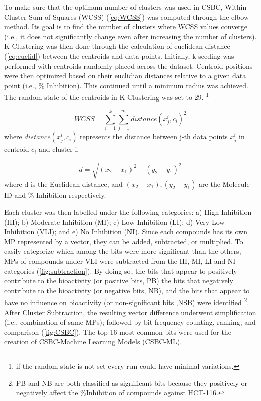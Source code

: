 To make sure that the optimum number of clusters was used in CSBC, Within-Cluster Sum of Squares (WCSS) (\autoref{eq:WCSS}) was computed through the elbow method. Its goal is to find the number of clusters where WCSS values converge (i.e., it does not significantly change even after increasing the number of clusters). K-Clustering was then done through the calculation of euclidean distance (\autoref{eq:euclid}) between the centroids and data points. Initially, k-seeding was performed with centroids randomly placed across the dataset. Centroid positions were then optimized based on their euclidian distances relative to a given data point (i.e., \% Inhibition). This continued until a minimum radius was achieved. The random state of the centroids in K-Clustering was set to 29. \footnote{if the random state is not set every run could have minimal variations.}


\begin{equation}
   WCSS =\sum_{i=1}^{k}\sum_{j=1}^{n_{i}}distance(x^{i}_{j},c_{i})^{2}
   \label{eq:WCSS}
\end{equation}    
where $distance(x^{i}_{j},c_{i})$ represents the distance between j-th data points $x^{i}_{j}$ in centroid $c_{i}$ and  cluster i. 

   
 \begin{equation}
    d =\sqrt{(x_{2}-x_{1})^2 +(y_{2}-y_{1})^2}
\label{eq:euclid}
\end{equation}
where d is the Euclidean distance, and $(x_{2}-x_{1}),(y_{2}-y_{1})$ are the Molecule ID and \% Inhibition respectively. 

Each cluster was then labelled under the following categories: a) High Inhibition (HI); b) Moderate Inhibition (MI); c) Low Inhibition (LI); d) Very Low Inhibition (VLI); and e) No Inhibition (NI). Since each compounds has its own MP represented by a vector, they can be added, subtracted, or multiplied. To easily categorize which among the bits were more significant than the others, MPs of compounds under VLI were subtracted from the HI, MI, LI and NI categories (\autoref{fig:subtraction}). By doing so, the bits that appear to positively contribute to the bioactivity (or positive bits, PB) the bits that negatively contribute to the bioactivity (or negative bits, NB), and the bits that appear to have no influence on bioactivity  (or non-significant bits ,NSB) were identified \footnote{PB and NB are both classified as significant bits because they positively or negatively affect the \%Inhibition of compounds against HCT-116.}. After Cluster Subtraction, the resulting vector difference underwent simplification (i.e., combination of same MPs); followed by bit frequency counting, ranking, and comparison (\autoref{fig:CSBC}). The top 16 most common bits were used for the creation of CSBC-Machine Learning Models (CSBC-ML).


